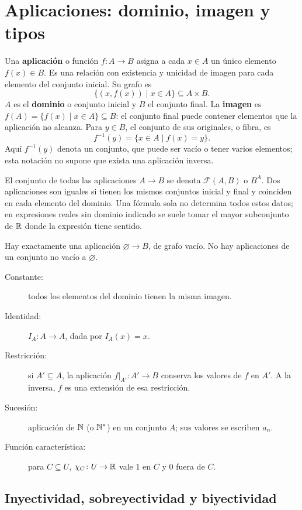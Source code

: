 \newpage
\section{Aplicaciones: dominio, imagen y tipos}
\label{sec:aplicaciones}

Una \textbf{aplicación} o función $f\colon A\to B$ asigna a cada $x\in A$
un único elemento $f(x)\in B$. Es una relación con existencia y unicidad
de imagen para cada elemento del conjunto inicial. Su grafo es
\[
 \{(x,f(x))\mid x\in A\}\subseteq A\times B.
\]
$A$ es el \textbf{dominio} o conjunto inicial y $B$ el conjunto final.
La \textbf{imagen} es $f(A)=\{f(x)\mid x\in A\}\subseteq B$:
el conjunto final puede contener elementos que la aplicación no alcanza.
Para $y\in B$, el conjunto de sus originales, o fibra, es
\[
 f^{-1}(y)=\{x\in A\mid f(x)=y\}.
\]
Aquí $f^{-1}(y)$ denota un conjunto, que puede ser vacío o tener varios
elementos; esta notación no supone que exista una aplicación inversa.

El conjunto de todas las aplicaciones $A\to B$ se denota
$\mathcal F(A,B)$ o $B^A$. Dos aplicaciones son iguales si tienen
los mismos conjuntos inicial y final y coinciden en cada elemento
del dominio. Una fórmula sola no determina todos estos datos;
en expresiones reales sin dominio indicado se suele tomar el mayor
subconjunto de $\mathbb{R}$ donde la expresión tiene sentido.

Hay exactamente una aplicación $\varnothing\to B$, de grafo vacío.
No hay aplicaciones de un conjunto no vacío a $\varnothing$.

\begin{description}
 \item[Constante:] todos los elementos del dominio tienen la misma imagen.
 \item[Identidad:] $I_A\colon A\to A$, dada por $I_A(x)=x$.
 \item[Restricción:] si $A'\subseteq A$, la aplicación
       $f|_{A'}\colon A'\to B$ conserva los valores de $f$ en $A'$.
       A la inversa, $f$ es una extensión de esa restricción.
 \item[Sucesión:] aplicación de $\mathbb{N}$ (o $\mathbb{N}^*$) en un conjunto $A$;
       sus valores se escriben $a_n$.
 \item[Función característica:] para $C\subseteq U$,
       $\chi_C\colon U\to\mathbb{R}$ vale $1$ en $C$ y $0$ fuera de $C$.
\end{description}

\subsection*{Inyectividad, sobreyectividad y biyectividad}

